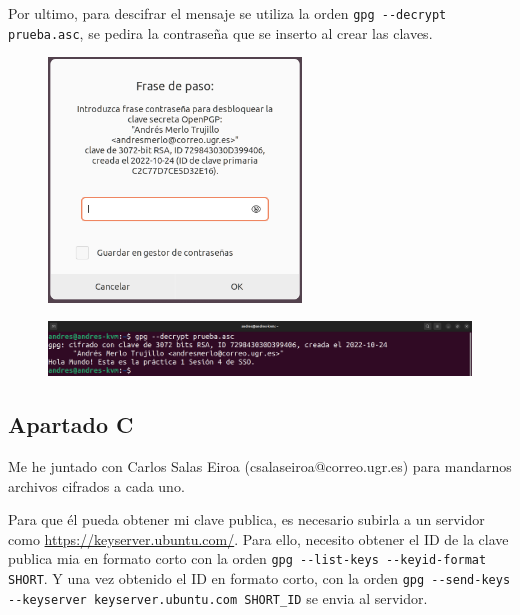 \documentclass{article}
\begin{document}
Por ultimo, para descifrar el mensaje se utiliza la orden \verb|gpg --decrypt prueba.asc|, se pedira la contraseña que se inserto al crear las claves.

\begin{figure}[H]
    \centering
    \includegraphics[width=0.6\textwidth]{imagenes/Portatil/Captura desde 2022-10-24 12-17-29.png}
\end{figure}

\begin{figure}[H]
    \includegraphics[width=\textwidth]{imagenes/Portatil/Captura desde 2022-10-27 18-35-01.png}
\end{figure}


\subsection*{Apartado C}

Me he juntado con Carlos Salas Eiroa (csalaseiroa@correo.ugr.es) para mandarnos archivos cifrados a cada uno.

Para que él pueda obtener mi clave publica, es necesario subirla a un servidor como \url{https://keyserver.ubuntu.com/}. Para ello, necesito obtener el ID de la clave publica mia en formato corto con la orden \verb|gpg --list-keys --keyid-format SHORT|. Y una vez obtenido el ID en formato corto, con la orden \verb|gpg --send-keys --keyserver keyserver.ubuntu.com SHORT_ID| se envia al servidor.
\end{document}

